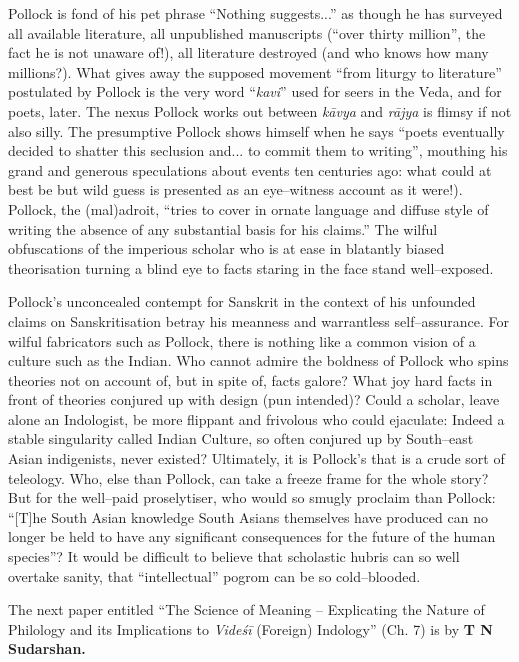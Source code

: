 Pollock is fond of his pet phrase “Nothing suggests...” as though he has surveyed all available literature, all unpublished manuscripts (“over thirty million”, the fact he is not unaware of!), all literature destroyed (and who knows how many millions?). What gives away the supposed movement “from liturgy to literature” postulated by Pollock is the very word “\textit{kavi}” used for seers in the Veda, and for poets, later. The nexus Pollock works out between \textit{kāvya} and \textit{rājya} is flimsy if not also silly. The presumptive Pollock shows himself when he says “poets eventually decided to shatter this seclusion and... to commit them to writing”, mouthing his grand and generous speculations about events ten centuries ago: what could at best be but wild guess is presented as an eye–witness account as it were!). Pollock, the (mal)adroit, “tries to cover in ornate language and diffuse style of writing the absence of any substantial basis for his claims.” The wilful obfuscations of the imperious scholar who is at ease in blatantly biased theorisation turning a blind eye to facts staring in the face stand well–exposed.

Pollock’s unconcealed contempt for Sanskrit in the context of his unfounded claims on Sanskritisation betray his meanness and warrantless self–assurance. For wilful fabricators such as Pollock, there is nothing like a common vision of a culture such as the Indian. Who cannot admire the boldness of Pollock who spins theories not on account of, but in spite of, facts galore? What joy hard facts in front of theories conjured up with design (pun intended)? Could a scholar, leave alone an Indologist, be more flippant and frivolous who could ejaculate: Indeed a stable singularity called Indian Culture, so often conjured up by South–east Asian indigenists, never existed? Ultimately, it is Pollock’s that is a crude sort of teleology. Who, else than Pollock, can take a freeze frame for the whole story? But for the well–paid proselytiser, who would so smugly proclaim than Pollock: “[T]he South Asian knowledge South Asians themselves have produced can no longer be held to have any significant consequences for the future of the human species”? It would be difficult to believe that scholastic hubris can so well overtake sanity, that “intellectual” pogrom can be so cold–blooded.

The next paper entitled “The Science of Meaning – Explicating the Nature of Philology and its Implications to \textit{Videśī} (Foreign) Indology” (Ch. 7) is by \textbf{T N Sudarshan.}

